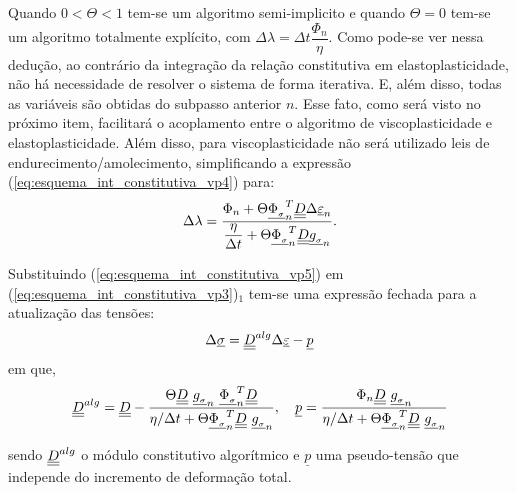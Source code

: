 Quando $0 < \Theta < 1$  tem-se um algoritmo semi-implicito e quando $\Theta = 0$ tem-se um algoritmo totalmente explícito, com $\Delta \lambda = \Delta t \dfrac{\Phi_n}{\eta}$. Como pode-se ver nessa dedução, ao contrário da integração da relação constitutiva em elastoplasticidade, não há necessidade de resolver o sistema de forma iterativa. E, além disso, todas as variáveis são obtidas do subpasso anterior $n$. Esse fato, como será visto no próximo item, facilitará o acoplamento entre o algoritmo de viscoplasticidade e elastoplasticidade. Além disso, para viscoplasticidade não será utilizado leis de endurecimento/amolecimento, simplificando a expressão (\ref{eq:esquema_int_constitutiva_vp4}) para:
\begin{equation}
	\label{eq:esquema_int_constitutiva_vp5}
	\Delta \lambda = \dfrac{\Phi_n + \Theta \underline{\Phi_{_\sigma}}_n^T\underline{\underline D}\Delta\underline{\varepsilon}_n}{\dfrac{\eta}{\Delta t} + \Theta \underline{\Phi_{_\sigma}}_n^T\underline{\underline D}\underline{g_{_\sigma}}_n}.
\end{equation}

Substituindo (\ref{eq:esquema_int_constitutiva_vp5}) em (\ref{eq:esquema_int_constitutiva_vp3})$_1$ tem-se uma expressão fechada para a atualização das tensões:
\begin{equation}
	\label{eq:esquema_int_constitutiva_vp6}
	\Delta \underline \sigma = \underline{\underline D}^{alg} \Delta \underline{\varepsilon} - \underline p
\end{equation}
em que,
\begin{equation}
	\label{eq:esquema_int_constitutiva_vp6}
	\underline{\underline D}^{alg} = \underline{\underline D} - \dfrac{\Theta \underline{\underline D}~\underline{g_{_\sigma}}_n~\underline{\Phi_{_\sigma}}_n^T \underline{\underline D}}{\eta/\Delta t+ \Theta \underline{\Phi_{_\sigma}}_n^T\underline{\underline D}~\underline{g_{_\sigma}}_n},~~~\underline p = \dfrac{\Phi_n \underline{\underline D} ~\underline{g_{_\sigma}}_n}{\eta/\Delta t+ \Theta \underline{\Phi_{_\sigma}}_n^T\underline{\underline D}~\underline{g_{_\sigma}}_n}
\end{equation}

sendo $\underline{\underline D}^{alg}$ o módulo constitutivo algorítmico e $\underline p$ uma pseudo-tensão que independe do incremento de deformação total.

